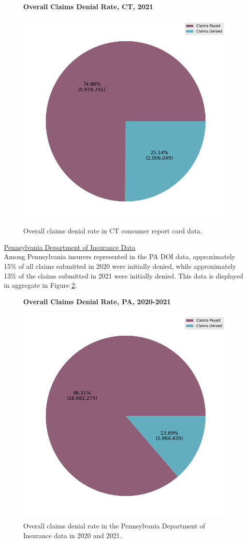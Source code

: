 \documentclass[12pt, a4paper,twoside]{report}
\theoremstyle{plain} %
\theoremstyle{definition} %
\theoremstyle{remark} %
\numberwithin{equation}{chapter}
\begin{document}
		\begin{figure}[h!]
			\centering
			\textbf{Overall Claims Denial Rate, CT, 2021}\par\medskip
			\includegraphics[width=.6\columnwidth]{images/ct_claims/overall_denial_pie.png}
			\caption{Overall claims denial rate in CT consumer report card data.}
			\label{ctoveralldenial}
		\end{figure}
		
		\underline{Pennsylvania Department of Insurance Data}\\
		
		Among Pennsylvania insurers represented in the PA DOI data, approximately 15\% of all claims submitted in 2020 were initially denied, while approximately 13\% of the claims submitted in 2021 were initially denied. This data is displayed in aggregate in Figure \ref{paoveralldenial}.
		
		\begin{figure}[h!]
			\centering
			\textbf{Overall Claims Denial Rate, PA, 2020-2021}\par\medskip
			\includegraphics[width=.6\columnwidth]{images/pa_claims/overall_denial_pie.png}
			\caption{Overall claims denial rate in the Pennsylvania Department of Insurance data in 2020 and 2021.}
			\label{paoveralldenial}
		\end{figure}
		
\end{document}
